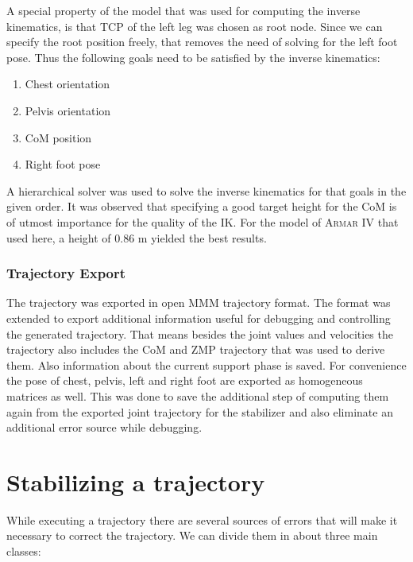 \documentclass[english,ngerman]{KITreprt}
\newcommand{\name}[1]{\textsc{#1}}
\begin{document}
A special property of the model that was used for computing the inverse
kinematics, is that TCP of the left leg was chosen as root node. Since
we can specify the root position freely, that removes the need of
solving for the left foot pose. Thus the following goals need to be
satisfied by the inverse kinematics:

\begin{enumerate}
\def\labelenumi{\arabic{enumi}.}
\item
  Chest orientation
\item
  Pelvis orientation
\item
  CoM position
\item
  Right foot pose
\end{enumerate}

A hierarchical solver was used to solve the inverse kinematics for that
goals in the given order. It was observed that specifying a good target
height for the CoM is of utmost importance for the quality of the IK.
For the model of \name{Armar IV} that used here, a height of $0.86$ m
yielded the best results.

\subsection{Trajectory Export}\label{trajectory-export}

The trajectory was exported in open \name{MMM} trajectory format. The
format was extended to export additional information useful for
debugging and controlling the generated trajectory. That means besides
the joint values and velocities the trajectory also includes the CoM and
ZMP trajectory that was used to derive them. Also information about the
current support phase is saved. For convenience the pose of chest,
pelvis, left and right foot are exported as homogeneous matrices as
well. This was done to save the additional step of computing them again
from the exported joint trajectory for the stabilizer and also eliminate
an additional error source while debugging.

\chapter{Stabilizing a trajectory}\label{stabilizing-a-trajectory}

While executing a trajectory there are several sources of errors that
will make it necessary to correct the trajectory. We can divide them in
about three main classes:
\end{document}
